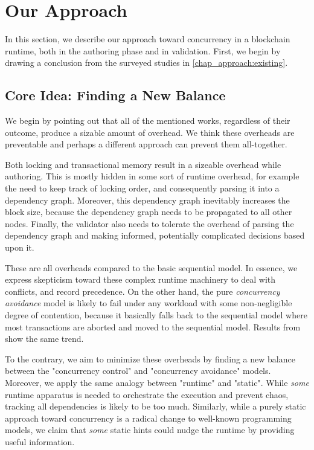 \section{Our Approach} \label{chap_desgin:sec:our_approach}

In this section, we describe our approach toward concurrency in a blockchain runtime, both in the
authoring phase and in validation. First, we begin by drawing a conclusion from the surveyed studies
in \ref{chap_approach:existing}.

\subsection{Core Idea: Finding a New Balance}

We begin by pointing out that all of the mentioned works, regardless of their outcome, produce a
sizable amount of overhead. We think these overheads are preventable and perhaps a different
approach can prevent them all-together.

Both locking and transactional memory result in a sizeable overhead while authoring. This is mostly
hidden in some sort of runtime overhead, for example the need to keep track of locking order, and
consequently parsing it into a dependency graph. Moreover, this dependency graph inevitably
increases the block size, because the dependency graph needs to be propagated to all other nodes.
Finally, the validator also needs to tolerate the overhead of parsing the dependency graph and
making informed, potentially complicated decisions based upon it.

These are all overheads compared to the basic sequential model. In essence, we express skepticism
toward these complex runtime machinery to deal with conflicts, and record precedence. On the other
hand, the pure \textit{concurrency avoidance} model is likely to fail under any workload with some
non-negligible degree of contention, because it basically falls back to the sequential model where
most transactions are aborted and moved to the sequential model. Results from
\cite{saraphEmpiricalStudySpeculative2019} show the same trend.

To the contrary, we aim to minimize these overheads by finding a new
balance between the "concurrency control" and "concurrency avoidance" models. Moreover, we apply the
same analogy between "runtime" and "static". While \textit{some} runtime apparatus is needed to
orchestrate the execution and prevent chaos, tracking all dependencies is likely to be too much.
Similarly, while a purely static approach toward concurrency is a radical change to well-known
programming models, we claim that \textit{some} static hints could nudge the runtime by providing
useful information.

